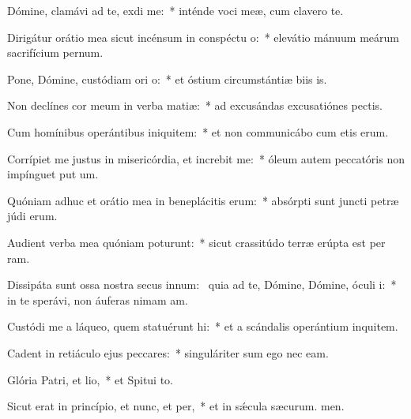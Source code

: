 \item Dómine, clamávi ad te, exdi me:~* inténde voci meæ, cum clavero  te.
\item Dirigátur orátio mea sicut incénsum in conspéctu o:~* elevátio mánuum meárum sacrifícium pernum.
\item Pone, Dómine, custódiam ori o:~* et óstium circumstántiæ biis is.
\item Non declínes cor meum in verba matiæ:~* ad excusándas excusatiónes  pectis.
\item Cum homínibus operántibus iniquitem:~* et non communicábo cum etis erum.
\item Corrípiet me justus in misericórdia, et increbit me:~* óleum autem peccatóris non impínguet put um.
\item Quóniam adhuc et orátio mea in beneplácitis erum:~* absórpti sunt juncti petræ júdi erum.
\item Audient verba mea quóniam poturunt:~* sicut crassitúdo terræ erúpta est per ram.
\item Dissipáta sunt ossa nostra secus innum:~\pscross{} quia ad te, Dómine, Dómine, óculi i:~* in te sperávi, non áuferas nimam am.
\item Custódi me a láqueo, quem statuérunt hi:~* et a scándalis operántium inquitem.
\item Cadent in retiáculo ejus peccares:~* singuláriter sum ego nec eam.
\item Glória Patri, et lio,~* et Spitui to.
\item Sicut erat in princípio, et nunc, et per,~* et in sǽcula sæcurum. men.
